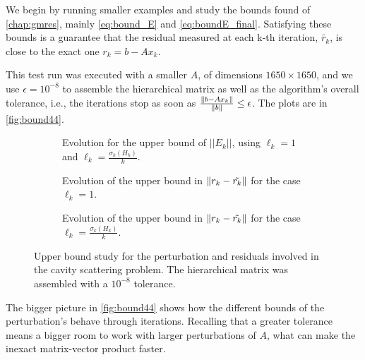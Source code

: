 We begin by running smaller examples and study the bounds found of \autoref{chap:gmres}, mainly \ref{eq:bound_E} and \ref{eq:boundE_final}. Satisfying these bounds is a guarantee that the residual measured at each k-th iteration, $\tilde{r_{k}}$, is close to the exact one $r_{k} =b-Ax_{k}$.


This test run was executed with a smaller $A$, of dimensions $1650\times 1650$, and we use $\epsilon = 10^{-8}$ to assemble the hierarchical matrix as well as the algorithm's overall tolerance, i.e., the iterations stop as soon as $\frac{\left\lVert b - Ax_{k}\right\rVert}{\left\lVert b\right\rVert} \leq \epsilon$. The plots are in \autoref{fig:bound44}.

\begin{figure}[h!]
    \centering
    \begin{subfigure}[b]{0.6\linewidth}
        
        \caption{Evolution for the upper bound of $||E_{k}||$, using $\ell_{k}=1$ and $\ell_{k}=\frac{\sigma_{k}(H_{k})}{k}$.}
    \end{subfigure}

    \begin{subfigure}[b]{0.4\linewidth}
        
        \caption{Evolution of the upper bound in $\left\lVert r_{k} - \tilde{r_{k}}\right\rVert$ for the case $\ell_{k}=1$.}
    \end{subfigure}
    \begin{subfigure}[b]{0.4\linewidth}
        
        \caption{Evolution of the upper bound in $\left\lVert r_{k} - \tilde{r_{k}}\right\rVert$ for the case $\ell_{k}=\frac{\sigma_{k}(H_{k})}{k}$.}
    \end{subfigure}
    \caption{Upper bound study for the perturbation and residuals involved in the cavity scattering problem. The hierarchical matrix was assembled with a $10^{-8}$ tolerance.}
    \label{fig:bound44}
\end{figure}

The bigger picture in \autoref{fig:bound44} shows how the different bounds of the perturbation's behave through iterations. Recalling that a greater tolerance means a bigger room to work with larger perturbations of $A$, what can make the inexact matrix-vector product faster.

